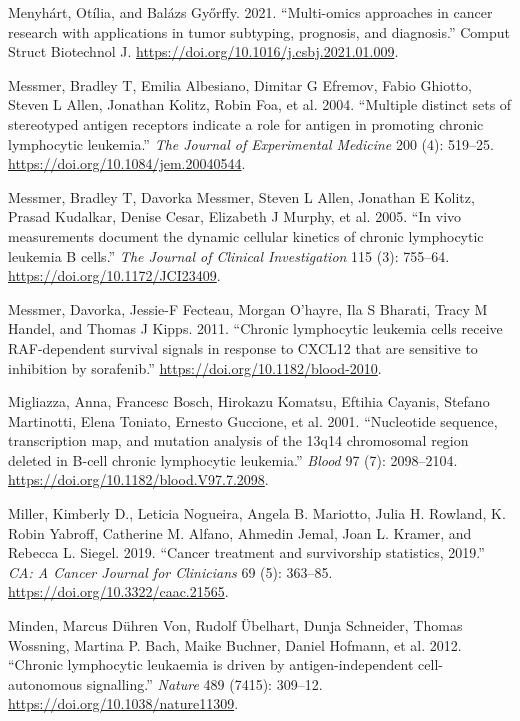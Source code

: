 \documentclass[11pt, a4paper, twosided]{book}
\newenvironment{CSLReferences}%
  {}%
  {\par}
\begin{document}
\begin{CSLReferences}{1}{0}
\leavevmode{}%
Menyhárt, Otília, and Balázs Győrffy. 2021. {``{Multi-omics approaches in cancer research with applications in tumor subtyping, prognosis, and diagnosis}.''} Comput Struct Biotechnol J. \url{https://doi.org/10.1016/j.csbj.2021.01.009}.

\leavevmode{}%
Messmer, Bradley T, Emilia Albesiano, Dimitar G Efremov, Fabio Ghiotto, Steven L Allen, Jonathan Kolitz, Robin Foa, et al. 2004. {``{Multiple distinct sets of stereotyped antigen receptors indicate a role for antigen in promoting chronic lymphocytic leukemia.}''} \emph{The Journal of Experimental Medicine} 200 (4): 519--25. \url{https://doi.org/10.1084/jem.20040544}.

\leavevmode{}%
Messmer, Bradley T, Davorka Messmer, Steven L Allen, Jonathan E Kolitz, Prasad Kudalkar, Denise Cesar, Elizabeth J Murphy, et al. 2005. {``{In vivo measurements document the dynamic cellular kinetics of chronic lymphocytic leukemia B cells.}''} \emph{The Journal of Clinical Investigation} 115 (3): 755--64. \url{https://doi.org/10.1172/JCI23409}.

\leavevmode{}%
Messmer, Davorka, Jessie-F Fecteau, Morgan O'hayre, Ila S Bharati, Tracy M Handel, and Thomas J Kipps. 2011. {``{Chronic lymphocytic leukemia cells receive RAF-dependent survival signals in response to CXCL12 that are sensitive to inhibition by sorafenib}.''} \url{https://doi.org/10.1182/blood-2010}.

\leavevmode{}%
Migliazza, Anna, Francesc Bosch, Hirokazu Komatsu, Eftihia Cayanis, Stefano Martinotti, Elena Toniato, Ernesto Guccione, et al. 2001. {``{Nucleotide sequence, transcription map, and mutation analysis of the 13q14 chromosomal region deleted in B-cell chronic lymphocytic leukemia}.''} \emph{Blood} 97 (7): 2098--2104. \url{https://doi.org/10.1182/blood.V97.7.2098}.

\leavevmode{}%
Miller, Kimberly D., Leticia Nogueira, Angela B. Mariotto, Julia H. Rowland, K. Robin Yabroff, Catherine M. Alfano, Ahmedin Jemal, Joan L. Kramer, and Rebecca L. Siegel. 2019. {``{Cancer treatment and survivorship statistics, 2019}.''} \emph{CA: A Cancer Journal for Clinicians} 69 (5): 363--85. \url{https://doi.org/10.3322/caac.21565}.

\leavevmode{}%
Minden, Marcus Dühren Von, Rudolf Übelhart, Dunja Schneider, Thomas Wossning, Martina P. Bach, Maike Buchner, Daniel Hofmann, et al. 2012. {``{Chronic lymphocytic leukaemia is driven by antigen-independent cell-autonomous signalling}.''} \emph{Nature} 489 (7415): 309--12. \url{https://doi.org/10.1038/nature11309}.


\end{CSLReferences}
\end{document}
